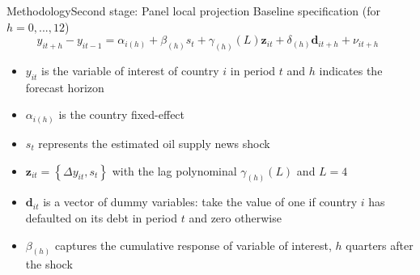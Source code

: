 \documentclass[compress,11pt,aspectratio=43]{beamer}
\begin{document}
\begin{frame}{Methodology}{Second stage: Panel local projection}
Baseline specification (for $h = 0,...,12$)
\begin{equation}\label{eq.4.8}
        {y}_{it+h}-{y}_{it-1} = \alpha_{i(h)} + \beta_{(h)} {s}_t + \gamma_{(h)}(L)\boldsymbol{z}_{it} + \delta_{(h)} \boldsymbol{d}_{it+h} + \nu_{it+h} \ \ 
\end{equation}
\vspace{-0.5cm}
\begin{itemize}
    \item ${y}_{it}$ is the variable of interest of country $i$ in period $t$ and $h$ indicates the forecast horizon 
    \item $\alpha_{i(h)}$ is the country fixed-effect
    \item ${s}_t$ represents the estimated oil supply news shock
    \item $\boldsymbol{z}_{it}=\left\lbrace \Delta y_{it}, s_t\right\rbrace$ with the lag polynominal $\gamma_{(h)}(L)$ and $L=4$
    \item $\boldsymbol{d}_{it}$ is a vector of dummy variables: take the value of one if country $i$ has defaulted on its debt in period $t$ and zero otherwise
    \item $\beta_{(h)}$ captures the \alert{cumulative response} of variable of interest, $h$ quarters after the shock
\end{itemize}
\end{frame}
\end{document}
